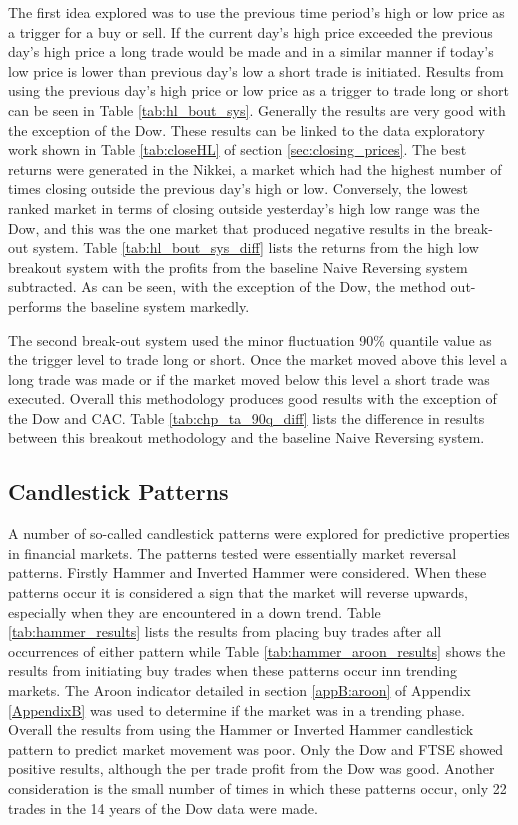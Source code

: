 The first idea explored was to use the previous time period's high or low price as a trigger for a buy or sell. If the current day's high price exceeded the previous day's high price a long trade would be made and in a similar manner if today's low price is lower than previous day's low a short trade is initiated. Results from using the previous day's high price or low price as a trigger to trade long or short can be seen in Table \ref{tab:hl_bout_sys}. Generally the results are very good with the exception of the Dow. These results can be linked to the data exploratory work shown in Table \ref{tab:closeHL} of section \ref{sec:closing_prices}. The best returns were generated in the Nikkei, a market which had the highest number of times closing outside the previous day's high or low. Conversely, the lowest ranked market in terms of closing outside yesterday's high low range was the Dow, and this was the one market that produced negative results in the break-out system. Table \ref{tab:hl_bout_sys_diff} lists the returns from the high low breakout system with the profits from the baseline Naive Reversing system subtracted. As can be seen, with the exception of the Dow, the method out-performs the baseline system markedly.



The second break-out system used the minor fluctuation 90\% quantile value as the trigger level to trade long or short. Once the market moved above this level a long trade was made or if the market moved below this level a short trade was executed. Overall this methodology produces good results with the exception of the Dow and CAC. Table \ref{tab:chp_ta_90q_diff} lists the difference in results between this breakout methodology and the baseline Naive Reversing system.



\subsection{Candlestick Patterns}
A number of so-called candlestick patterns were explored for predictive properties in financial markets. The patterns tested were essentially market reversal patterns. Firstly Hammer and Inverted Hammer were considered. When these patterns occur it is considered a sign that the market will reverse upwards, especially when they are encountered in a down trend. Table \ref{tab:hammer_results} lists the results from placing buy trades after all occurrences of either pattern while Table \ref{tab:hammer_aroon_results} shows the results from initiating buy trades when these patterns occur inn trending markets. The Aroon indicator detailed in section \ref{appB:aroon} of Appendix \ref{AppendixB} was used to determine if the market was in a trending phase. Overall the results from using the Hammer or Inverted Hammer candlestick pattern to predict market movement was poor. Only the Dow and FTSE showed positive results, although the per trade profit from the Dow was good. Another consideration is the small number of times in which these patterns occur, only 22 trades in the 14 years of the Dow data were made.

